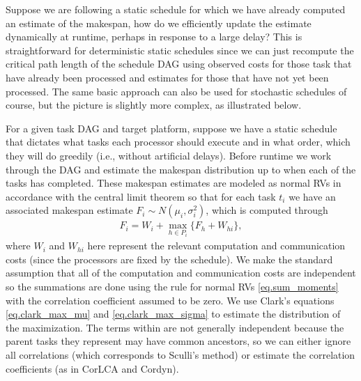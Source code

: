 \documentclass[12pt]{article}
\begin{document}

Suppose we are following a static schedule for which we have already computed an estimate of the makespan, how do we efficiently update the estimate dynamically at runtime, perhaps in response to a large delay? This is straightforward for deterministic static schedules since we can just recompute the critical path length of the schedule DAG using observed costs for those task that have already been processed and estimates for those that have not yet been processed. The same basic approach can also be used for stochastic schedules of course, but the picture is slightly more complex, as illustrated below.    

For a given task DAG and target platform, suppose we have a static schedule that dictates what tasks each processor should execute and in what order, which they will do greedily (i.e., without artificial delays). Before runtime we work through the DAG and estimate the makespan distribution up to when each of the tasks has completed. These makespan estimates are modeled as normal RVs in accordance with the central limit theorem so that for each task $t_i$ we have an associated makespan estimate $F_i \sim N(\mu_i, \sigma_i^2)$, which is computed through  
\begin{align}
F_i = W_i + \max_{h \in P_i} \{ F_h + W_{hi} \}, \label{eq.finish_time}
\end{align} 
where $W_i$ and $W_{hi}$ here represent the relevant computation and communication costs (since the processors are fixed by the schedule). We make the standard assumption that all of the computation and communication costs are independent so the summations are done using the rule for normal RVs \eqref{eq.sum_moments} with the correlation coefficient assumed to be zero. We use Clark's equations \eqref{eq.clark_max_mu} and \eqref{eq.clark_max_sigma} to estimate the distribution of the maximization. The terms within are not generally independent because the parent tasks they represent may have common ancestors, so we can either ignore all correlations (which corresponds to Sculli's method) or estimate the correlation coefficients (as in CorLCA and Cordyn). 
\end{document}
